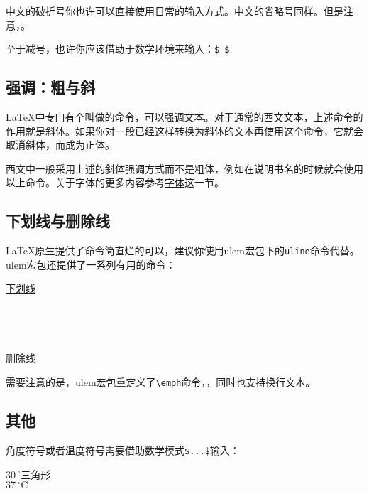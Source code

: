 {中文的破折号你也许可以直接使用日常的输入方式。中文的省略号同样。但是注意，。

至于减号，也许你应该借助于数学环境来输入：\verb|$-$|.

\subsection{强调：粗与斜}
\LaTeX 中专门有个叫做的命令，可以强调文本。对于通常的西文文本，上述命令的作用就是斜体。如果你对一段已经这样转换为斜体的文本再使用这个命令，它就会取消斜体，而成为正体。

西文中一般采用上述的斜体强调方式而不是粗体，例如在说明书名的时候就会使用以上命令。关于字体的更多内容参考\hyperref[sec:font]{字体}这一节。

\subsection{下划线与删除线}
\LaTeX 原生提供了\latexline{\\underline}命令简直烂的可以，建议你使用ulem宏包下的\texttt{uline}命令代替。ulem宏包还提供了一系列有用的命令：

\begin{codeshow}
\uline{下划线} \\
 \\
 \\
 \\
 \\
\sout{删除线} \\
\end{codeshow}

需要注意的是，ulem宏包重定义了\verb|\emph|命令，，同时也支持换行文本。

\subsection{其他}
角度符号或者温度符号需要借助数学模式\verb|$...$|输入：

\begin{codeshow}
$30\,^{\circ}$三角形 \\
$37\,^{\circ}\mathrm{C}$
\end{codeshow}

}
